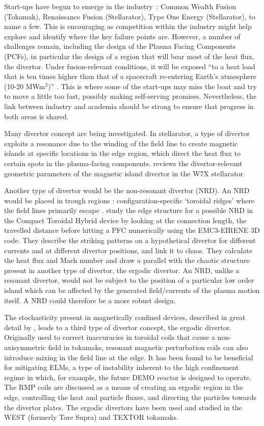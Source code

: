 Start-ups have begun to emerge in the industry~: Common Wealth Fusion (Tokamak), Renaissance Fusion (Stellarator), Type One Energy (Stellarator), to name a few. This is encouraging as competition within the industry might help explore and identify where the key failure points are. However, a number of challenges remain, including the design of the Plasma Facing Components (PCFs), in particular the design of a region that will bear most of the heat flux, the divertor. Under fusion-relevant conditions, it will be exposed ``to a heat load that is ten times higher than that of a spacecraft re-entering Earth's atmosphere (10-20 MWm$^2$)'' \cite{iter_divertor_nodate}. This is where some of the start-ups may miss the boat and try to move a little too fast, possibly making self-serving promises. Nevertheless, the link between industry and academia should be strong to ensure that progress in both areas is shared. 

Many divertor concept are being investigated. In stellarator, a type of divertor exploits a resonance due to the winding of the field line to create magnetic islands at specific locations in the edge region, which direct the heat flux to certain spots in the plasma-facing components. \cite{feng_review_2022} reviews the divertor-relevant geometric parameters of the magnetic island divertor in the W7X stellarator.

Another type of divertor would be the non-resonant divertor (NRD). An NRD would be placed in trough regions : configuration-specific `toroidal ridges' where the field lines primarily escape \cite{bader_hsx_2017}. \cite{garcia_exploration_2023} study the edge structure for a possible NRD in the Compact Toroidal Hybrid device by looking at the connection length, the travelled distance before hitting a PFC numerically using the EMC3-EIRENE 3D code. They describe the striking patterns on a hypothetical divertor for different currents and at different divertor positions, and link it to chaos. They calculate the heat flux and Mach number and draw a parallel with the chaotic structure present in another type of divertor, the ergodic divertor. An NRD, unlike a resonant divertor, would not be subject to the position of a particular low order island which can be affected by the generated field/currents of the plasma motion itself. A NRD could therefore be a more robust design.

The stochasticity present in magnetically confined devices, described in great detail by \cite{abdullaev_magnetic_2014}, leads to a third type of divertor concept, the ergodic divertor. Originally used to correct inaccuracies in toroidal coils that cause a non-axisymmetric field in tokamaks, resonant magnetic perturbation coils can also introduce mixing in the field line at the edge. It has been found to be beneficial for mitigating ELMs, a type of instability inherent to the high confinement regime in which, for example, the future DEMO reactor is designed to operate. The RMP coils are discussed as a means of creating an ergodic region in the edge, controlling the heat and particle fluxes, and directing the particles towards the divertor plates. The ergodic divertors have been used and studied in the WEST (formerly Tore Supra) and TEXTOR tokamaks.

